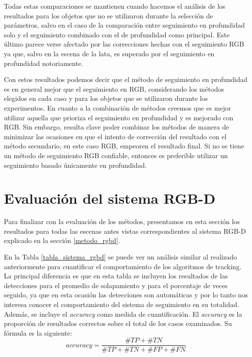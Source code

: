 Todas estas comparaciones se mantienen cuando hacemos el análisis de los resultados para los objetos que no se utilizaron durante la selección de parámetros, salvo en el caso de la comparación entre seguimiento en profundidad solo y el seguimiento combinado con el de profundidad como principal. Este último parece verse afectado por las correcciones hechas con el seguimiento RGB ya que, salvo en la escena de la lata, es superado por el seguimiento en profundidad notoriamente.

Con estos resultados podemos decir que el método de seguimiento en profundidad es en general mejor que el seguimiento en RGB, considerando los métodos elegidos en cada caso y para los objetos que se utilizaron durante los experimentos. En cuanto a la combinación de métodos creemos que es mejor utilizar aquella que prioriza el seguimiento en profundidad y es mejorado con RGB. Sin embargo, resulta clave poder combinar los métodos de manera de minimizar las ocasiones en que el intento de corrección del resultado con el método secundario, en este caso RGB, empeoren el resultado final. Si no se tiene un método de seguimiento RGB confiable, entonces es preferible utilizar un seguimiento basado únicamente en profundidad.


\section{Evaluación del sistema RGB-D}\label{sec:evaluacion_rgbd}
Para finalizar con la evaluación de los métodos, presentamos en esta sección los resultados para todas las escenas antes vistas correspondientes al sistema RGB-D explicado en la sección \ref{metodo_rgbd}.

En la Tabla \ref{tabla_sistema_rgbd} se puede ver un análisis similar al realizado anteriormente para cuantificar el comportamiento de los algoritmos de tracking. La principal diferencia es que en esta tabla se incluyen los resultados de las detecciones para el promedio de solapamiento y para el porcentaje de veces seguido, ya que en esta ocasión las detecciones son automáticas y por lo tanto nos interesa conocer el comportamiento del sistema de seguimiento en su totalidad. Además, se incluye el \textit{accuracy} como medida de cuantificación. El \textit{accuracy} es la proporción de resultados correctos sobre el total de los casos examinados. Su fórmula es la siguiente:
\begin{equation}
accuracy = \frac{\#TP + \#TN}{\#TP + \#TN + \#FP + \#FN}
\end{equation}

